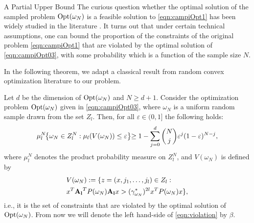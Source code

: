 \begin{subsection}{A Partial Upper Bound}
The curious question whether the optimal solution of the sampled problem $\text{Opt}(\omega_N)$ is a feasible solution to \eqref{eqn:campiOpt1} has been widely studied in the literature \cite{campi}. It turns out that under certain technical assumptions, one can bound the proportion of the constraints of the original problem \eqref{eqn:campiOpt1} that are violated by the optimal solution of \eqref{eqn:campiOpt03}, with some probability which is a function of the sample size $N$. 

In the following theorem, we adapt a classical result from random convex optimization literature to our problem.
\begin{thm}\label{mainTheorem0}
Let $d$ be the dimension of $\text{Opt}(\omega_N)$ and $N \geq d+1$. Consider the optimization problem $\text{Opt}(\omega_N)$ given in \eqref{eqn:campiOpt03}, where $\omega_N$ is a uniform random sample drawn from the set $Z_l$.
Then, for all $\varepsilon \in (0,1]$ the following holds:
\begin{equation}\label{eqn:violation}
\mu_l^N\hspace{-1mm}\left\{ \omega_N \in Z_l^N: \mu_l(V(\omega_N)) \leq \varepsilon \right\}\hspace{-1mm} \geq 1- \sum_{j=0}^{d} \binom{N}{j}\varepsilon^j (1-\varepsilon)^{N-j},
\end{equation}
where $\mu_l^N$ denotes the product probability measure on $Z_l^N$, and $V(\omega_N)$ is defined by \small{
\begin{equation*} 
\begin{aligned}
& V(\omega_N) := \{z=(x,j_{1},\dots,j_{l}) \in Z_l: \\
&x^T \mathbf{A_l}^T P(\omega_N)\mathbf{A_l} x> (\gamma_{\omega_N}^{*})^{2l} x^T P(\omega_N) x\},
\end{aligned}
\end{equation*}
}
i.e., it is the set of constraints that are violated by the optimal solution of $\text{Opt}(\omega_N)$. From now we will denote the left hand-side of \eqref{eqn:violation} by $\beta$.
\end{thm}




\end{subsection}
